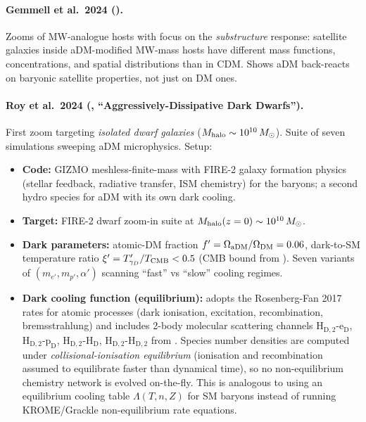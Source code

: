 \documentclass[12pt]{article}
\newcommand{\HD}{\mathrm{H_D}}
\newcommand{\HDtwo}{\mathrm{H_{D,2}}}
\newcommand{\pD}{\mathrm{p_D}}
\newcommand{\eD}{\mathrm{e_D}}
\newcommand{\gD}{\gamma_D}
\newcommand{\Msun}{\,M_\odot}
\begin{document}
\paragraph{Gemmell et al.\ 2024 (\citealt{Gemmell2023}).} Zooms of MW-analogue
hosts with focus on the \emph{substructure} response: satellite
galaxies inside aDM-modified MW-mass hosts have different mass
functions, concentrations, and spatial distributions than in CDM.
Shows aDM back-reacts on baryonic satellite properties, not just on
DM ones.

\paragraph{Roy et al.\ 2024 (\citealt{Roy2024}, ``Aggressively-Dissipative
Dark Dwarfs'').} First zoom targeting \emph{isolated dwarf galaxies}
($M_{\rm halo}\sim 10^{10}\Msun$).  Suite of seven simulations sweeping
aDM microphysics.  Setup:
%
\begin{itemize}
  \item \textbf{Code:} GIZMO meshless-finite-mass with FIRE-2 galaxy
        formation physics (stellar feedback, radiative transfer, ISM
        chemistry) for the baryons; a second hydro species for aDM
        with its own dark cooling.
  \item \textbf{Target:} FIRE-2 dwarf zoom-in suite at
        $M_{\rm halo}(z=0)\sim 10^{10}\Msun$.
  \item \textbf{Dark parameters:} atomic-DM fraction
        $f' = \Omega_{\rm aDM}/\Omega_{\rm DM} = 0.06$, dark-to-SM
        temperature ratio $\xi' = T_{\gD}'/T_{\rm CMB} < 0.5$ (CMB
        bound from \citealt{Bansal2022}).  Seven variants of
        $(m_{e'}, m_{p'}, \alpha')$ scanning ``fast'' vs ``slow''
        cooling regimes.
  \item \textbf{Dark cooling function (equilibrium):} adopts the
        Rosenberg-Fan 2017 rates for atomic processes (dark
        ionisation, excitation, recombination, bremsstrahlung)
        and includes 2-body molecular scattering channels
        $\HDtwo\text{-}\eD$, $\HDtwo\text{-}\pD$,
        $\HDtwo\text{-}\HD$, $\HDtwo\text{-}\HDtwo$ from
        \citet{Ryan2022a,Ryan2022b}.  Species number densities are
        computed under \emph{collisional-ionisation equilibrium}
        (ionisation and recombination assumed to equilibrate faster
        than dynamical time), so no non-equilibrium chemistry
        network is evolved on-the-fly.  This is analogous to using
        an equilibrium cooling table
        $\Lambda(T, n, Z)$ for SM baryons instead of running
        KROME/Grackle non-equilibrium rate equations.
\end{itemize}
\end{document}

